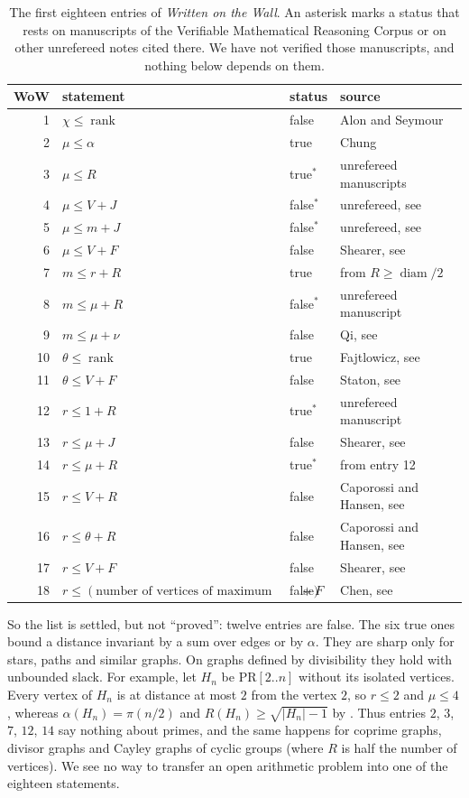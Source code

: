 \documentclass[11pt]{amsart}
\theoremstyle{definition}
\theoremstyle{remark}
\newcommand{\PR}{\mathrm{PR}}
\begin{document}
\begin{table}[ht]
\centering\small
\begin{tabular}{@{}rlll@{}}
\toprule
WoW & statement & status & source\\
\midrule
1 & $\chi\le\operatorname{rank}$ & false & Alon and Seymour \cite{AS}\\
2 & $\mu\le\alpha$ & true & Chung \cite{Chung}\\
3 & $\mu\le R$ & true$^{*}$ & unrefereed manuscripts \cite{V226,V227}\\
4 & $\mu\le V+J$ & false$^{*}$ & unrefereed, see \cite{V243}\\
5 & $\mu\le m+J$ & false$^{*}$ & unrefereed, see \cite{V243}\\
6 & $\mu\le V+F$ & false & Shearer, see \cite{WOW}\\
7 & $m\le r+R$ & true & from $R\ge\operatorname{diam}/2$ \cite{DLS}\\
8 & $m\le\mu+R$ & false$^{*}$ & unrefereed manuscript \cite{V244}\\
9 & $m\le\mu+\nu$ & false & Qi, see \cite{WOW}\\
10 & $\theta\le\operatorname{rank}$ & true & Fajtlowicz, see \cite{WOW}\\
11 & $\theta\le V+F$ & false & Staton, see \cite{WOW}\\
12 & $r\le1+R$ & true$^{*}$ & unrefereed manuscript \cite{V161}\\
13 & $r\le\mu+J$ & false & Shearer, see \cite{WOW}\\
14 & $r\le\mu+R$ & true$^{*}$ & from entry 12\\
15 & $r\le V+R$ & false & Caporossi and Hansen, see \cite{WOW}\\
16 & $r\le\theta+R$ & false & Caporossi and Hansen, see \cite{WOW}\\
17 & $r\le V+F$ & false & Shearer, see \cite{WOW}\\
18 & $r\le(\text{number of vertices of maximum degree})+F$ & false & Chen, see \cite{WOW}\\
\bottomrule
\end{tabular}
\caption{The first eighteen entries of \emph{Written on the Wall}. An asterisk marks a status that rests on manuscripts of the Verifiable Mathematical Reasoning Corpus or on other unrefereed notes cited there. We have not verified those manuscripts, and nothing below depends on them.}
\label{tab:1988}
\end{table}

So the list is settled, but not ``proved'': twelve entries are false. The six true ones bound a distance invariant by a sum over edges or by $\alpha$. They are sharp only for stars, paths and similar graphs. On graphs defined by divisibility they hold with unbounded slack. For example, let $H_n$ be $\PR[2..n]$ without its isolated vertices. Every vertex of $H_n$ is at distance at most $2$ from the vertex $2$, so $r\le2$ and $\mu\le4$, whereas $\alpha(H_n)=\pi(n/2)$ and $R(H_n)\ge\sqrt{|H_n|-1}$ by \cite{BE}. Thus entries $2$, $3$, $7$, $12$, $14$ say nothing about primes, and the same happens for coprime graphs, divisor graphs and Cayley graphs of cyclic groups (where $R$ is half the number of vertices). We see no way to transfer an open arithmetic problem into one of the eighteen statements.
\end{document}
